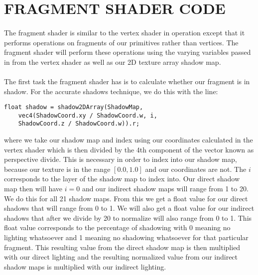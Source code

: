\section{FRAGMENT SHADER CODE}\label{sec:fragShader}
\paragraph{}
The fragment shader is similar to the vertex shader in operation except that it performs operations on fragments of our primitives rather than vertices.  The fragment shader will perform these operations using the varying variables passed in from the vertex shader as well as our 2D texture array shadow map.

\paragraph{}
The first task the fragment shader has is to calculate whether our fragment is in shadow.  For the accurate shadows technique, we do this with the line:

\begin{lstlisting}
float shadow = shadow2DArray(ShadowMap, 
	vec4(ShadowCoord.xy / ShadowCoord.w, i, 
	ShadowCoord.z / ShadowCoord.w)).r;
\end{lstlisting}

where we take our shadow map and index using our coordinates calculated in the vertex shader which is then divided by the 4th component of the vector known as perspective divide.  This is necessary in order to index into our shadow map, because our texture is in the range $[0.0, 1.0]$ and our coordinates are not.  The $i$ corresponds to the layer of the shadow map to index into.  Our direct shadow map then will have $i=0$ and our indirect shadow maps will range from 1 to 20.  We do this for all 21 shadow maps.  From this we get a float value for our direct shadows that will range from 0 to 1.  We will also get a float value for our indirect shadows that after we divide by 20 to normalize will also range from 0 to 1.  This float value corresponds to the percentage of shadowing with 0 meaning no lighting whatsoever and 1 meaning no shadowing whatsoever for that particular fragment.  This resulting value from the direct shadow map is then multiplied with our direct lighting and the resulting normalized value from our indirect shadow maps is multiplied with our indirect lighting.

